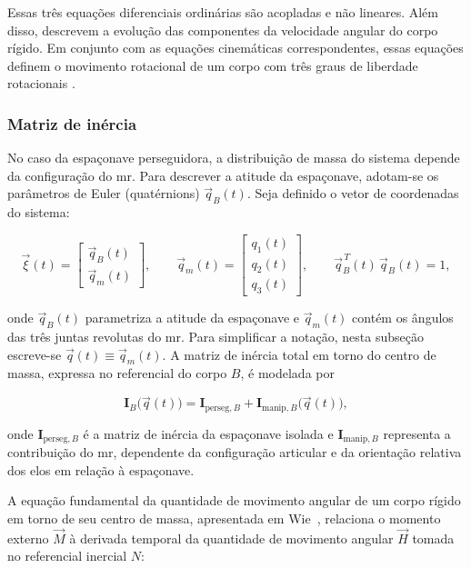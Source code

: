 Essas três equações diferenciais ordinárias são acopladas e não lineares.
Além disso, descrevem a evolução das componentes da velocidade angular do corpo rígido.
Em conjunto com as equações cinemáticas correspondentes, essas equações definem o movimento rotacional de um corpo com três graus de liberdade rotacionais \cite{wie2008space}.

\subsubsection{Matriz de inércia}
\label{sec:tensor_inercia_variavel}

No caso da espaçonave perseguidora, a distribuição de massa do sistema depende da configuração do \gls{mr}.
Para descrever a atitude da espaçonave, adotam-se os parâmetros de Euler (quatérnions) $\vec{q}_B(t)$.
Seja definido o vetor de coordenadas do sistema:

\begin{equation}
\vec{\xi}(t) =
\begin{bmatrix}
\vec{q}_B(t) \\
\vec{q}_m(t)
\end{bmatrix},
\qquad
\vec{q}_m(t) =
\begin{bmatrix}
q_1(t) \\ q_2(t) \\ q_3(t)
\end{bmatrix},
\qquad
\vec{q}_B^{\,T}(t)\,\vec{q}_B(t)=1,
\end{equation}

onde $\vec{q}_B(t)$ parametriza a atitude da espaçonave e $\vec{q}_m(t)$ contém os
ângulos das três juntas revolutas do \gls{mr}.
Para simplificar a notação, nesta subseção escreve-se $\vec{q}(t)\equiv\vec{q}_m(t)$.
A matriz de inércia total em torno do centro de massa, expressa no referencial do
corpo $B$, é modelada por

\begin{equation}
\mathbf{I}_B\big(\vec{q}(t)\big)
=
\mathbf{I}_{\text{perseg},B}
+
\mathbf{I}_{\text{manip},B}\big(\vec{q}(t)\big),
\label{eq:inercia_total}
\end{equation}

onde $\mathbf{I}_{\text{perseg},B}$ é a matriz de inércia da espaçonave isolada e
$\mathbf{I}_{\text{manip},B}$ representa a contribuição do \gls{mr}, dependente
da configuração articular e da orientação relativa dos elos em relação à espaçonave.


A equação fundamental da quantidade de movimento angular de um corpo rígido em
torno de seu centro de massa, apresentada em Wie~\cite{wie2008space}, relaciona
o momento externo $\vec{M}$ à derivada temporal da quantidade de movimento
angular $\vec{H}$ tomada no referencial inercial $N$:

